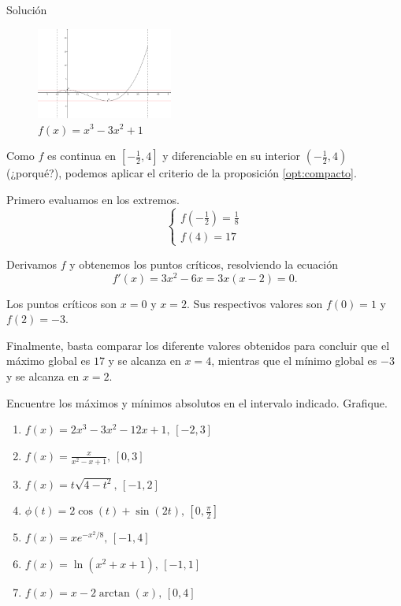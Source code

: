{Solución}

    \begin{figure}
        \centering
        \includegraphics[height=3cm,keepaspectratio=true]{./calculo/optimizacion.png}
        \caption{$f(x)=x^3-3x^2+1$}
        \label{fig:optimizacion}
    \end{figure}



    Como $f$ es continua en $[-\frac{1}{2},4]$ y diferenciable en su interior $(-\frac{1}{2},4)$ (¿porqué?), podemos
    aplicar el criterio de la proposición \ref{opt:compacto}.



    Primero evaluamos en los extremos.
    $$
    \begin{cases}
        f(-\frac{1}{2})=\frac{1}{8} \\
        f(4)=17
    \end{cases}
    $$

    Derivamos $f$ y obtenemos los puntos críticos, resolviendo la ecuación
    $$
    f'(x)=3x^{2}-6x=3x(x-2)=0.
    $$

    Los puntos críticos son $x=0$ y $x=2.$ Sus respectivos valores son $f(0)=1$ y $f(2)=-3.$

    Finalmente, basta comparar los diferente valores obtenidos para concluir que el máximo global es $17$ y se alcanza en
    $x=4$, mientras que el mínimo global es $-3$ y se alcanza en $x=2.$





    \begin{resuelto}
        Encuentre los máximos y mínimos absolutos en el intervalo indicado. Grafique.
        \begin{enumerate}
            \item $f(x)=2x^{3}-3x^{2}-12x+1, \, [-2,3]$
            \item $f(x)=\frac{x}{x^{2}-x+1}, \, [0,3]$
            \item $f(x)=t\sqrt{4-t^{2}}, \, [-1,2]$
            \item $\phi(t)=2\cos(t)+\sin(2t), \, [0, \frac{\pi}{2}]$
            \item $f(x)=xe^{-x^{2}/8}, \, [-1,4]$
            \item $f(x)=\ln(x^{2}+x+1), \, [-1,1]$
            \item $f(x)=x-2\arctan(x), \, [0,4]$
        \end{enumerate}

    \end{resuelto}


